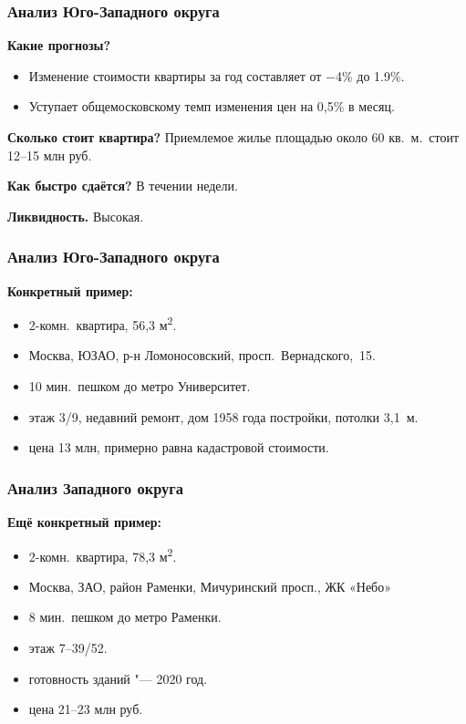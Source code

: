 \documentclass{beamer}
\begin{document}
		\begin{frame}
			\frametitle{Анализ Юго-Западного округа}
		
			\textbf{Какие прогнозы?}
			\begin{itemize}
			\item Изменение стоимости квартиры за год составляет от $-$4\% до 1.9\%.
			\item Уступает общемосковскому темп изменения цен на 0,5\% в месяц.
			\end{itemize}
			
			\textbf{Сколько стоит квартира?} Приемлемое жилье площадью около 60 кв.\ м.\ стоит 12--15 млн руб.
			
			\textbf{Как быстро сдаётся?} В течении недели.
			
			\textbf{Ликвидность.} Высокая.
			
		\end{frame}
		
		\begin{frame}
			\frametitle{Анализ Юго-Западного округа}
			\textbf{Конкретный пример:}
				\begin{itemize}
				\item 2-комн.\ квартира, 56,3 м\textsuperscript{2}.
				\item Москва, ЮЗАО, р-н Ломоносовский, просп.\ Вернадского,~15.
				\item 10 мин.\ пешком до метро Университет.
				\item этаж 3/9, недавний ремонт, дом 1958 года постройки, потолки 3,1~м.
				\item цена 13 млн, примерно равна кадастровой стоимости.
				\end{itemize}

		\end{frame}

		
		\begin{frame}
			\frametitle{Анализ Западного округа}
			\textbf{Ещё конкретный пример:}
				\begin{itemize}
				\item 2-комн.\ квартира, 78,3 м\textsuperscript{2}.
				\item Москва, ЗАО, район Раменки, Мичуринский просп., ЖК «Небо»
				\item 8 мин.\ пешком до метро Раменки.
				\item этаж 7--39/52.
				\item готовность зданий "--- 2020 год.
				\item цена 21--23 млн руб.
				\end{itemize}

		\end{frame}
\end{document}
